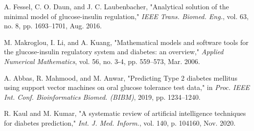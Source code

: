 \documentclass[conference]{IEEEtran}
\begin{document}

\begin{thebibliography}{00}

 A. Fessel, C. O. Daun, and J. C. Laubenbacher, "Analytical solution of the minimal model of glucose-insulin regulation," \textit{IEEE Trans. Biomed. Eng.}, vol. 63, no. 8, pp. 1693–1701, Aug. 2016.

 M. Makroglou, I. Li, and A. Kuang, "Mathematical models and software tools for the glucose-insulin regulatory system and diabetes: an overview," \textit{Applied Numerical Mathematics}, vol. 56, no. 3-4, pp. 559–573, Mar. 2006.

 A. Abbas, R. Mahmood, and M. Anwar, "Predicting Type 2 diabetes mellitus using support vector machines on oral glucose tolerance test data," in \textit{Proc. IEEE Int. Conf. Bioinformatics Biomed. (BIBM)}, 2019, pp. 1234–1240.

 R. Kaul and M. Kumar, "A systematic review of artificial intelligence techniques for diabetes prediction," \textit{Int. J. Med. Inform.}, vol. 140, p. 104160, Nov. 2020.

\end{thebibliography}
\end{document}
